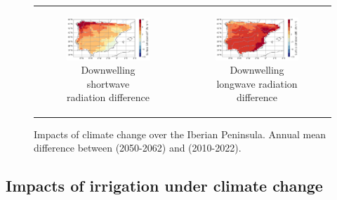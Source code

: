\begin{figure}[htbp]
\begin{tabular}{cc}
        \begin{subfigure}[b]{0.5\textwidth}
            \caption{Downwelling shortwave radiation difference}
            \includegraphics[width=\textwidth]{images/chap4/future/diffmap_SWdnSFC_presfut.png}
        \end{subfigure} &
        \begin{subfigure}[b]{0.5\textwidth}
            \caption{Downwelling longwave radiation difference}
            \includegraphics[width=\textwidth]{images/chap4/future/diffmap_LWdnSFC_presfut.png}
        \end{subfigure}
    \end{tabular}
    \caption{Impacts of climate change over the Iberian Peninsula. Annual mean difference between \futnoirr (2050-2062) and  \presnoirr (2010-2022).}
    \label{fig:diffmaps_present_future}
\end{figure}

\clearpage

\subsection{Impacts of irrigation under climate change}

